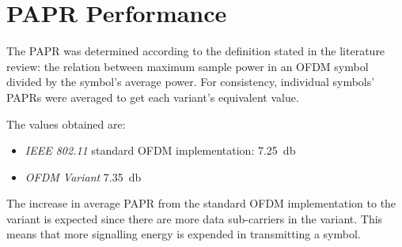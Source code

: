 \section{PAPR Performance}

The \gls{PAPR} was determined according to the definition stated in the literature review: the relation between maximum sample power in an OFDM symbol divided by the symbol's average power. For consistency, individual symbols' PAPRs were averaged to get each variant's equivalent value.

The values obtained are:
\begin{itemize}
	\item \emph{IEEE 802.11 } standard OFDM implementation: \SI{7.25}{\decibel}
	\item \emph{OFDM Variant} \SI{7.35}{\decibel}
\end{itemize}

The increase in average \gls{PAPR} from the standard OFDM implementation to the variant is expected since there are more data sub-carriers in the variant. This means that more signalling energy is expended in transmitting a symbol.
\pagebreak
